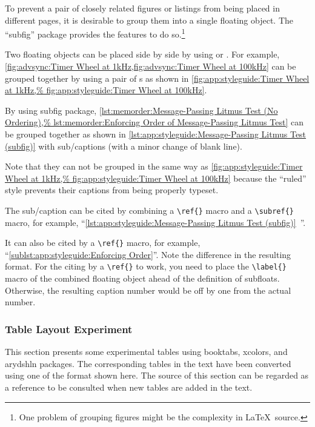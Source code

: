 To prevent a pair of closely related figures or listings
from being placed in different pages, it is desirable to group
them into a single floating object.
The ``subfig'' package provides the features to do so.\footnote{
  One problem of grouping figures might be the complexity in
  \LaTeX\ source.}

Two floating objects can be placed side by side by using
\co{\\parbox} or .
For example,
\cref{fig:advsync:Timer Wheel at 1kHz,fig:advsync:Timer Wheel at 100kHz}
can be grouped together by using a pair of s
as shown in
\cref{fig:app:styleguide:Timer Wheel at 1kHz,%
fig:app:styleguide:Timer Wheel at 100kHz}.

By using subfig package,
\cref{lst:memorder:Message-Passing Litmus Test (No Ordering),%
lst:memorder:Enforcing Order of Message-Passing Litmus Test}
can be grouped together as shown in
\cref{lst:app:styleguide:Message-Passing Litmus Test (subfig)}
with sub\-/captions (with a minor change of blank line).

Note that they can not be grouped in the same way as
\cref{fig:app:styleguide:Timer Wheel at 1kHz,%
fig:app:styleguide:Timer Wheel at 100kHz}
because the ``ruled'' style prevents their captions
from being properly typeset.

The sub\-/caption can be cited by combining a \verb|\ref{}| macro
and a \verb|\subref{}| macro, for example,
``\cref{lst:app:styleguide:Message-Passing Litmus Test (subfig)}\,%
''.

It can also be cited by a \verb|\ref{}| macro, for example,
``\cref{sublst:app:styleguide:Enforcing Order}''.
Note the difference in the resulting format. For the citing by
a \verb|\ref{}| to work, you need to place the \verb|\label{}|
macro of the combined floating object ahead of the definition of
subfloats.
Otherwise, the resulting caption number would be off by one
from the actual number.

\subsubsection{Table Layout Experiment}
\label{sec:app:styleguide:Table Layout Experiment}

This section presents some experimental tables
using booktabs, xcolors, and arydshln packages.
The corresponding tables in the text have been converted using one of
the format shown here. The source of this section can be regarded
as a reference to be consulted when new tables are added in the text.

